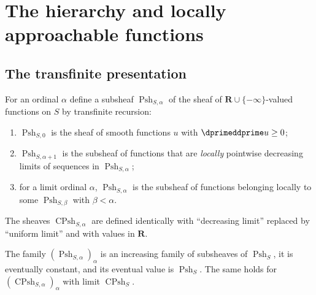 \section{The hierarchy and locally approachable functions}
\label{sec:ch15-hierarchy}

\subsection{The transfinite presentation}

\begin{definition}
\label{def:ch15-hierarchy}
For an ordinal $\alpha$ define a subsheaf
$\operatorname{Psh}_{S,\alpha}$ of the sheaf of
$\mathbf R\cup\{-\infty\}$-valued functions on $S$ by transfinite recursion:
\begin{enumerate}
\item $\operatorname{Psh}_{S,0}$ is the sheaf of smooth functions $u$ with
  $\dprimeddprime u\ge0$;
\item $\operatorname{Psh}_{S,\alpha+1}$ is the subsheaf of functions that are
  \emph{locally} pointwise decreasing limits of sequences in
  $\operatorname{Psh}_{S,\alpha}$;
\item for a limit ordinal $\alpha$, $\operatorname{Psh}_{S,\alpha}$ is the
  subsheaf of functions belonging locally to some
  $\operatorname{Psh}_{S,\beta}$ with $\beta<\alpha$.
\end{enumerate}
The sheaves $\operatorname{CPsh}_{S,\alpha}$ are defined identically with
``decreasing limit'' replaced by ``uniform limit'' and with values in
$\mathbf R$.
\end{definition}

\begin{proposition}
\label{prop:ch15-hierarchy-stabilizes}
The family $(\operatorname{Psh}_{S,\alpha})_\alpha$ is an increasing family
of subsheaves of $\operatorname{Psh}_S$, it is eventually constant, and its
eventual value is $\operatorname{Psh}_S$.  The same holds for
$(\operatorname{CPsh}_{S,\alpha})_\alpha$ with limit
$\operatorname{CPsh}_S$.
\end{proposition}

